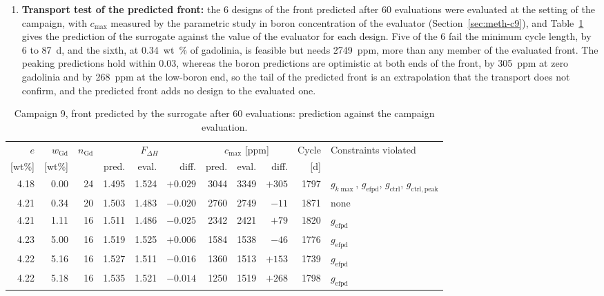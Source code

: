 \begin{itemize}
\begin{enumerate}
          \item \textbf{Transport test of the predicted front:} the 6
                designs of the front predicted after 60 evaluations were
                evaluated at the setting of the campaign, with
                $c_\mathrm{max}$ measured by the parametric study in
                boron concentration of the evaluator
                (Section~\ref{sec:meth-c9}), and
                Table~\ref{tab:c9-predicted-front} gives the prediction
                of the surrogate against the value of the evaluator for
                each design. Five of the 6 fail the minimum cycle length,
                by 6 to \SI{87}{d}, and the sixth, at \SI{0.34}{wt\%} of
                gadolinia, is feasible but needs \SI{2749}{ppm}, more
                than any member of the evaluated front. The peaking
                predictions hold within 0.03, whereas the boron
                predictions are optimistic at both ends of the front, by
                \SI{305}{ppm} at zero gadolinia and by \SI{268}{ppm} at
                the low-boron end, so the tail of the predicted front is
                an extrapolation that the transport does not confirm,
                and the predicted front adds no design to the evaluated
                one.
        \end{enumerate}

\begin{table}[htbp]
  \centering
  \footnotesize
  \caption{Campaign 9, front predicted by the surrogate after 60 evaluations: prediction against the campaign evaluation.}
  \label{tab:c9-predicted-front}
  \setlength{\tabcolsep}{3pt}
  \begin{tabular}{@{}rrrrrrrrrrl@{}}
    \toprule
    $e$ & $w_\mathrm{Gd}$ & $n_\mathrm{Gd}$ & \multicolumn{3}{c}{$F_{\Delta H}$} & \multicolumn{3}{c}{$c_\mathrm{max}$ [ppm]} & Cycle & Constraints violated \\
    \cmidrule(lr){4-6}\cmidrule(lr){7-9}
    [wt\%] & [wt\%] & & pred. & eval. & diff. & pred. & eval. & diff. & [d] & \\
    \midrule
    4.18 & 0.00 & 24 & 1.495 & 1.524 & $+0.029$ & 3044 & 3349 & $+305$ & 1797 & $g_{k\max}$, $g_\mathrm{efpd}$, $g_\mathrm{ctrl}$, $g_\mathrm{ctrl,peak}$ \\
    4.21 & 0.34 & 20 & 1.503 & 1.483 & $-0.020$ & 2760 & 2749 & $-11$  & 1871 & none \\
    4.21 & 1.11 & 16 & 1.511 & 1.486 & $-0.025$ & 2342 & 2421 & $+79$  & 1820 & $g_\mathrm{efpd}$ \\
    4.23 & 5.00 & 16 & 1.519 & 1.525 & $+0.006$ & 1584 & 1538 & $-46$  & 1776 & $g_\mathrm{efpd}$ \\
    4.22 & 5.16 & 16 & 1.527 & 1.511 & $-0.016$ & 1360 & 1513 & $+153$ & 1739 & $g_\mathrm{efpd}$ \\
    4.22 & 5.18 & 16 & 1.535 & 1.521 & $-0.014$ & 1250 & 1519 & $+268$ & 1798 & $g_\mathrm{efpd}$ \\
    \bottomrule
  \end{tabular}
\end{table}


\end{itemize}
